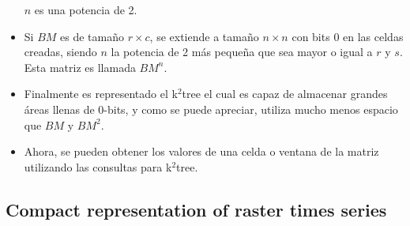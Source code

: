 \documentclass{article}
\begin{document}
\begin{itemize}
    $n$ es una potencia de 2.
  \item Si $BM$ es de tamaño $r \times c$, se extiende a tamaño $n \times n$ con
    bits 0 en las celdas creadas, siendo $n$ la potencia de 2 más pequeña
    que sea mayor o igual a $r$ y $s$. Esta matriz es llamada $BM^n$.
  \item Finalmente es representado el k$^2$tree el cual es capaz de almacenar
    grandes áreas llenas de 0-bits, y como se puede apreciar, utiliza mucho menos
    espacio que $BM$ y $BM^2$.
  \item Ahora, se pueden obtener los valores de una celda o ventana de la matriz
    utilizando las consultas para k$^2$tree.
\end{itemize}

\subsection*{Compact representation of raster times series}
\end{document}
